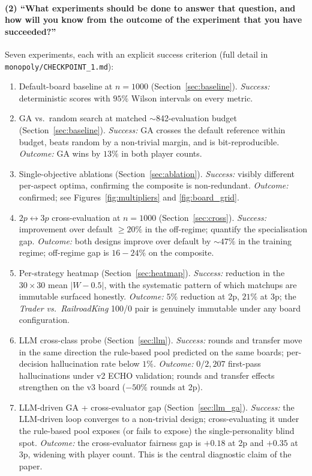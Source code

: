 \documentclass[10pt]{article}
\begin{document}
\paragraph{(2) ``What experiments should be done to answer that
question, and how will you know from the outcome of the experiment
that you have succeeded?''}
Seven experiments, each with an explicit success criterion (full
detail in \texttt{monopoly/CHECKPOINT\_1.md}):
\begin{enumerate}[leftmargin=1.4em,itemsep=1pt]
\item Default-board baseline at $n{=}1000$
(Section~\ref{sec:baseline}). \emph{Success:} deterministic scores
with $95\%$ Wilson intervals on every metric.
\item GA vs.\ random search at matched $\sim$842-evaluation budget
(Section~\ref{sec:baseline}). \emph{Success:} GA crosses the
default reference within budget, beats random by a non-trivial
margin, and is bit-reproducible. \emph{Outcome:} GA wins by $13\%$
in both player counts.
\item Single-objective ablations (Section~\ref{sec:ablation}).
\emph{Success:} visibly different per-aspect optima, confirming the
composite is non-redundant. \emph{Outcome:} confirmed; see
Figures~\ref{fig:multipliers} and \ref{fig:board_grid}.
\item $2p\!\leftrightarrow\!3p$ cross-evaluation at $n{=}1000$
(Section~\ref{sec:cross}). \emph{Success:} improvement over default
$\geq 20\%$ in the off-regime; quantify the specialisation gap.
\emph{Outcome:} both designs improve over default by $\sim 47\%$ in
the training regime; off-regime gap is $16\!-\!24\%$ on the
composite.
\item Per-strategy heatmap (Section~\ref{sec:heatmap}).
\emph{Success:} reduction in the $30\times 30$ mean $|W-0.5|$, with
the systematic pattern of which matchups are immutable surfaced
honestly. \emph{Outcome:} $5\%$ reduction at 2p, $21\%$ at 3p; the
\textsl{Trader vs.\ RailroadKing} 100/0 pair is genuinely
immutable under any board configuration.
\item LLM cross-class probe (Section~\ref{sec:llm}). \emph{Success:}
rounds and transfer move in the same direction the rule-based pool
predicted on the same boards; per-decision hallucination rate below
$1\%$. \emph{Outcome:} $0/2{,}207$ first-pass hallucinations under
v2 ECHO validation; rounds and transfer effects strengthen on the
v3 board ($-50\%$ rounds at 2p).
\item LLM-driven GA + cross-evaluator gap
(Section~\ref{sec:llm_ga}). \emph{Success:} the LLM-driven loop
converges to a non-trivial design; cross-evaluating it under the
rule-based pool exposes (or fails to expose) the
single-personality blind spot. \emph{Outcome:} the cross-evaluator
fairness gap is $+0.18$ at 2p and $+0.35$ at 3p, widening with
player count. This is the central diagnostic claim of the paper.
\end{enumerate}



\end{document}
